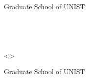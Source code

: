 \documentclass[11pt,a4paper,onecolumn,oneside]{report}
\begin{document}





\begin{center}

\LARGE \Type

\vspace{3cm}
\huge \Title

\vfill

\LARGE \Name

\vspace{2cm}

\LARGE \Department

\LARGE \Track

\vspace{2cm}

\LARGE Graduate School of UNIST

\vspace{2cm}

\LARGE \Year

\end{center}
\thispagestyle{empty}
\clearpage

\begin{center}
\hbox{ }

\hbox{ }

\huge <\Title>

\vspace{5cm}

\LARGE \Name

\vspace{6cm}

\LARGE \Department

\LARGE \Track

\vspace{2cm}

\LARGE Graduate School of UNIST

\end{center}
\thispagestyle{empty}
\clearpage
\end{document}
